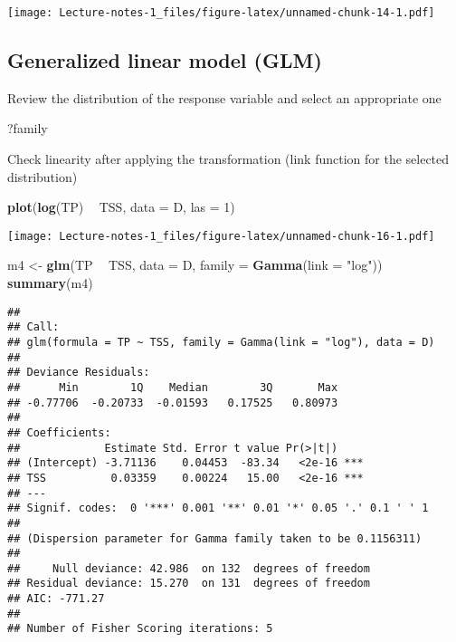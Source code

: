 \documentclass[
]{book}
\newenvironment{Shaded}{\begin{snugshade}}{\end{snugshade}}
\newcommand{\DataTypeTok}[1]{\textcolor[rgb]{0.13,0.29,0.53}{#1}}
\newcommand{\DecValTok}[1]{\textcolor[rgb]{0.00,0.00,0.81}{#1}}
\newcommand{\KeywordTok}[1]{\textcolor[rgb]{0.13,0.29,0.53}{\textbf{#1}}}
\newcommand{\NormalTok}[1]{#1}
\newcommand{\OperatorTok}[1]{\textcolor[rgb]{0.81,0.36,0.00}{\textbf{#1}}}
\newcommand{\StringTok}[1]{\textcolor[rgb]{0.31,0.60,0.02}{#1}}
\begin{document}
\texttt{[image: Lecture-notes-1\_files/figure-latex/unnamed-chunk-14-1.pdf]}

\hypertarget{generalized-linear-model-glm-1}{%
\subsection{Generalized linear model (GLM)}\label{generalized-linear-model-glm-1}}

Review the distribution of the response variable and select an appropriate one

\begin{Shaded}
\begin{Highlighting}[]
\NormalTok{?family}
\end{Highlighting}
\end{Shaded}

Check linearity after applying the transformation (link function for the selected distribution)

\begin{Shaded}
\begin{Highlighting}[]
\KeywordTok{plot}\NormalTok{(}\KeywordTok{log}\NormalTok{(TP) }\OperatorTok{~}\StringTok{ }\NormalTok{TSS, }\DataTypeTok{data =}\NormalTok{ D, }\DataTypeTok{las =} \DecValTok{1}\NormalTok{)}
\end{Highlighting}
\end{Shaded}

\texttt{[image: Lecture-notes-1\_files/figure-latex/unnamed-chunk-16-1.pdf]}

\begin{Shaded}
\begin{Highlighting}[]
\NormalTok{m4 <-}\StringTok{ }\KeywordTok{glm}\NormalTok{(TP }\OperatorTok{~}\StringTok{ }\NormalTok{TSS, }\DataTypeTok{data =}\NormalTok{ D, }\DataTypeTok{family =} \KeywordTok{Gamma}\NormalTok{(}\DataTypeTok{link =} \StringTok{"log"}\NormalTok{))}
\KeywordTok{summary}\NormalTok{(m4)}
\end{Highlighting}
\end{Shaded}

\begin{verbatim}
## 
## Call:
## glm(formula = TP ~ TSS, family = Gamma(link = "log"), data = D)
## 
## Deviance Residuals: 
##      Min        1Q    Median        3Q       Max  
## -0.77706  -0.20733  -0.01593   0.17525   0.80973  
## 
## Coefficients:
##             Estimate Std. Error t value Pr(>|t|)    
## (Intercept) -3.71136    0.04453  -83.34   <2e-16 ***
## TSS          0.03359    0.00224   15.00   <2e-16 ***
## ---
## Signif. codes:  0 '***' 0.001 '**' 0.01 '*' 0.05 '.' 0.1 ' ' 1
## 
## (Dispersion parameter for Gamma family taken to be 0.1156311)
## 
##     Null deviance: 42.986  on 132  degrees of freedom
## Residual deviance: 15.270  on 131  degrees of freedom
## AIC: -771.27
## 
## Number of Fisher Scoring iterations: 5
\end{verbatim}
\end{document}
